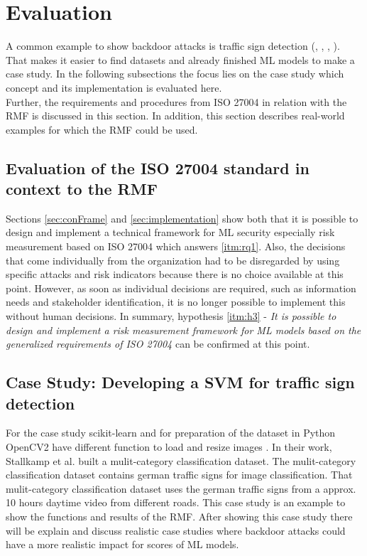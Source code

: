 \section{Evaluation}
\label{sec:evaluation}

A common example to show backdoor attacks is traffic sign detection (\cite{DBLP:journals/corr/abs-2102-10369}, \cite{DBLP:journals/corr/abs-1708-06733}, \cite{DBLP:conf/codaspy/NudingM20},
\cite{DBLP:journals/tdsc/LiXZZZ21}). That makes it easier to find datasets and already finished ML models to make a case study. In the following subsections the focus lies on the case study which concept and its implementation is evaluated here. \\ Further, the requirements and procedures from ISO 27004 in relation with the RMF is discussed in this section. In addition, this section describes real-world examples for which the RMF could be used.

\subsection{Evaluation of the ISO 27004 standard in context to the RMF}

Sections \ref{sec:conFrame} and \ref{sec:implementation} show both that it is possible to design and implement a technical framework for ML security especially risk measurement based on ISO 27004 \cite{ISO_27004_2009} which answers \ref{itm:rq1}. Also, the decisions that come individually from the organization had to be disregarded by using specific attacks and risk indicators because there is no choice available at this point. However, as soon as individual decisions are required, such as information needs and stakeholder identification, it is no longer possible to implement this without human decisions. In summary, hypothesis \ref{itm:h3} - \textit{It is possible to design and implement a risk measurement framework for ML models based on the generalized requirements of ISO 27004} can be confirmed at this point.

\subsection{Case Study: Developing a SVM for traffic sign detection}

For the case study scikit-learn \cite{scikit-learn} and for preparation of the dataset in Python OpenCV2 have different function to load and resize images \cite{opencv_library}. In their work, Stallkamp et al. \cite{DBLP:conf/ijcnn/StallkampSSI11} built a mulit-category classification dataset. The mulit-category classification dataset contains german traffic signs for image classification. That mulit-category classification dataset uses the german traffic signs from a approx. 10 hours daytime video from different roads.
This case study is an example to show the functions and results of the RMF. After showing this case study there will be explain and discuss realistic case studies where backdoor attacks could have a more realistic impact for scores of ML models.

